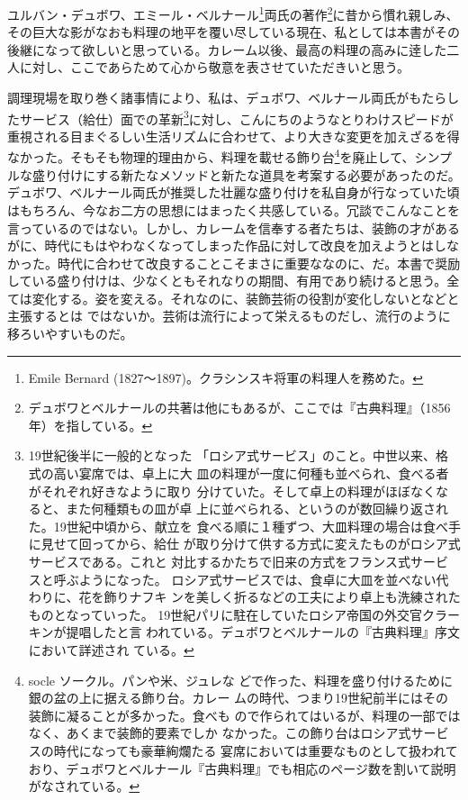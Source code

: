 \begin{Main}
ユルバン・デュボワ、エミール・ベルナール\footnote{Emile Bernard
  (1827〜1897)。クラシンスキ将軍の料理人を務めた。}両氏の著作\footnote{デュボワとベルナールの共著は他にもあるが、ここでは『古典料理』（1856年）を指している。}に昔から慣れ親しみ、その巨大な影がなおも料理の地平を覆い尽している現在、私としては本書がその後継になって欲しいと思っている。カレーム以後、最高の料理の高みに逹した二人に対し、ここであらためて心から敬意を表させていただきいと思う。

調理現場を取り巻く諸事情により、私は、デュボワ、ベルナール両氏がもたらしたサービス（給仕）面での革新\footnote{\protect\hypertarget{service-russe}{19世紀後半に一般的となった
  「ロシア式サービス」のこと。中世以来、格式の高い宴席では、卓上に大
  皿の料理が一度に何種も並べられ、食べる者がそれぞれ好きなように取り
  分けていた。そして卓上の料理がほぼなくなると、また何種類もの皿が卓
  上に並べられる、というのが数回繰り返された。19世紀中頃から、献立を
  食べる順に１種ずつ、大皿料理の場合は食べ手に見せて回ってから、給仕
  が取り分けて供する方式に変えたものがロシア式サービスである。これと
  対比するかたちで旧来の方式をフランス式サービスと呼ぶようになった。
  ロシア式サービスでは、食卓に大皿を並べない代わりに、花を飾りナフキ
  ンを美しく折るなどの工夫により卓上も洗練されたものとなっていった。
  19世紀パリに駐在していたロシア帝国の外交官クラーキンが提唱したと言
  われている。デュボワとベルナールの『古典料理』序文において詳述され
  ている。}}に対し、こんにちのようなとりわけスピードが重視される目まぐるしい生活リズムに合わせて、より大きな変更を加えざるを得なかった。そもそも物理的理由から、料理を載せる飾り台\footnote{\protect\hypertarget{socle}{socle ソークル。パンや米、ジュレな
  どで作った、料理を盛り付けるために銀の盆の上に据える飾り台。カレー
  ムの時代、つまり19世紀前半にはその装飾に凝ることが多かった。食べも
  ので作られてはいるが、料理の一部ではなく、あくまで装飾的要素でしか
  なかった。この飾り台はロシア式サービスの時代になっても豪華絢爛たる
  宴席においては重要なものとして扱われており、デュボワとベ}ルナール『古典料理』でも相応のページ数を割いて説明がなされている。}を廃止して、シンプルな盛り付けにする新たなメソッドと新たな道具を考案する必要があったのだ。デュボワ、ベルナール両氏が推奨した壮麗な盛り付けを私自身が行なっていた頃はもちろん、今なお二方の思想にはまったく共感している。冗談でこんなことを言っているのではない。しかし、カレームを信奉する者たちは、装飾の才があるがに、時代にもはやわなくなってしまった作品に対して改良を加えようとはしなかった。時代に合わせて改良することこそまさに重要ななのに、だ。本書で奨励している盛り付けは、少なくともそれなりの期間、有用であり続けると思う。全ては変化する。姿を変える。それなのに、装飾芸術の役割が変化しないとなどと主張するとは
ではないか。芸術は流行によって栄えるものだし、流行のように移ろいやすいものだ。


\end{Main}
